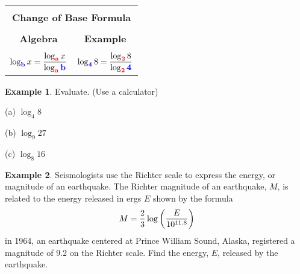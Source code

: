 \documentclass{report}
\theoremstyle{definition}
\newtheorem{example}{\bf Example}
\begin{document}
\begin{center}
	\large
	\begin{tabular}[t]{|c|c|}
		\hline
		\multicolumn{2}{|c|}{}\\
		\multicolumn{2}{|c|}{\textbf{Change of Base Formula}\large}\\
		\hline
		&\\
		\qquad\qquad  \textbf{Algebra} \qquad\qquad\qquad & \qquad\qquad \textbf{Example} \qquad\qquad\qquad\\
		\hline
		&\\
		$\log_{\color{blue}\mathbf{b}\color{black}} x = \displaystyle\frac{\log_{\color{red}\mathbf{a}\color{black}} x}{\log_{\color{red}\mathbf{a}\color{black}} {\color{blue}\mathbf{b}\color{black}}}$ 
		&
		$\log_{\color{blue}\mathbf{4}\color{black}} 8 = \displaystyle\frac{\log_{\color{red}\mathbf{2}\color{black}} 8}{\log_{\color{red}\mathbf{2}\color{black}} {\color{blue}\mathbf{4}\color{black}}}$\\
		\hline
	\end{tabular}
	\normalsize
\end{center}


\begin{example}
Evaluate. (Use a calculator)
\end{example}

\begin{minipage}[t]{0.3\linewidth}
	 (a) $\log_4 8$
\end{minipage}
\hfill
\begin{minipage}[t]{0.3\linewidth}
 	(b) $\log_9 27$
\end{minipage}
\hfill
\begin{minipage}[t]{0.3\linewidth}
	 (c) $\log_8 16$
\end{minipage}
\vfill

\begin{example}
Seismologists use the Richter scale to express the energy, or magnitude of an earthquake. The Richter magnitude of an earthquake, $M$, is related to the energy released in ergs $E$ shown by the formula 
\[M = \frac{2}{3}\log\bigg{(} \frac{E}{10^{11.8}} \bigg{)}\]
in 1964, an earthquake centered at Prince William Sound, Alaska, registered a magnitude of 9.2 on the Richter scale. Find the energy, $E$, released by the earthquake.
\end{example}



\vfill
 \noindent{}
 \newpage
\end{document}
